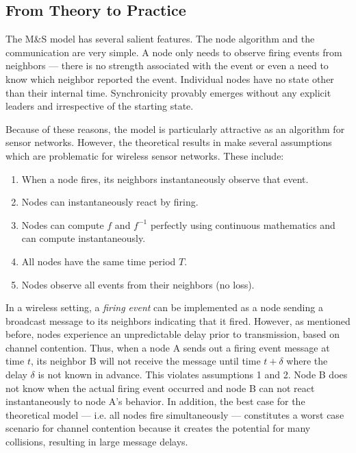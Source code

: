 \subsection{From Theory to Practice}

The M\&S model has several salient features. The node algorithm and
the communication are very simple. A node only needs to observe firing
events from neighbors --- there is no strength associated with the
event or even a need to know which neighbor reported the
event. Individual nodes have no state other than their internal
time. Synchronicity provably emerges without any explicit leaders and
irrespective of the starting state.

Because of these reasons, the model is particularly attractive as an
algorithm for sensor networks. However, the theoretical results in
\cite{strogatz,lucarelli04} make several assumptions which are
problematic for wireless sensor networks. These include:

\begin{enumerate}

\item When a node fires, its neighbors instantaneously observe that
event. 

\item Nodes can instantaneously react by firing.

\item Nodes can compute $f$ and $f^{-1}$ perfectly using continuous
mathematics and can compute instantaneously.

\item All nodes have the same time period $T$.

\item Nodes observe all events from their neighbors (no loss).

\end{enumerate}

In a wireless setting, a {\em firing event} can be implemented as a
node sending a broadcast message to its neighbors indicating that it
fired. However, as mentioned before, nodes experience an unpredictable
delay prior to transmission, based on channel contention. Thus, when a
node A sends out a firing event message at time $t$, its neighbor
B will not receive the message until time $t + \delta$ where the
delay $\delta$ is not known in advance.  This violates assumptions 1
and 2. Node B does not know when the actual firing event occurred
and node B can not react instantaneously to node A's behavior. In
addition, the best case for the theoretical model --- i.e. all nodes
fire simultaneously --- constitutes a worst case scenario for channel
contention because it creates the potential for many collisions,
resulting in large message delays.

